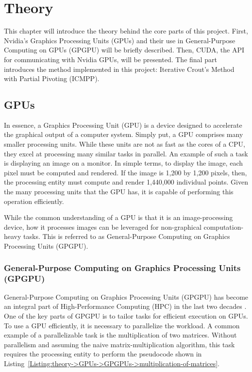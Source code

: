 \chapter{Theory}

This chapter will introduce the theory behind the core parts of this project.
First, Nvidia's Graphics Processing Units (GPUs) and their use in General-Purpose Computing on GPUs (GPGPU) will be briefly described.
Then, CUDA, the API for communicating with Nvidia GPUs, will be presented.
The final part introduces the method implemented in this project: Iterative Crout's Method with Partial Pivoting (ICMPP).

\section{GPUs}\label{Section:theory->GPUs}
In essence, a Graphics Processing Unit (GPU) is a device designed to accelerate the graphical output of a computer system.
Simply put, a GPU comprises many smaller processing units.
While these units are not as fast as the cores of a CPU, they excel at processing many similar tasks in parallel.
An example of such a task is displaying an image on a monitor.
In simple terms, to display the image, each pixel must be computed and rendered.
If the image is 1,200 by 1,200 pixels, then, the processing entity must compute and render 1,440,000 individual points.
Given the many processing units that the GPU has, it is capable of performing this operation efficiently.

While the common understanding of a GPU is that it is an image-processing device, how it processes images can be leveraged for non-graphical computation-heavy tasks.
This is referred to as General-Purpose Computing on Graphics Processing Units (GPGPU).

\subsection{General-Purpose Computing on Graphics Processing Units (GPGPU)}\label{Subsection:theory->GPUs->GPGPU}
General-Purpose Computing on Graphics Processing Units (GPGPU) has become an integral part of High-Performance Computing (HPC) in the last two decades \cite{Cejka2020, Cejka2022}.
One of the key parts of GPGPU is to tailor tasks for efficient execution on GPUs.
To use a GPU efficiently, it is necessary to parallelize the workload.
A common example of a parallelizable task is the multiplication of two matrices.
Without parallelism and assuming the naive matrix-multiplication algorithm, this task requires the processing entity to perform the pseudocode shown in Listing~\ref{Listing:theory->GPUs->GPGPUs->multiplication-of-matrices}.

